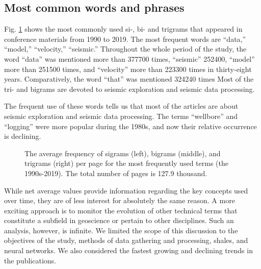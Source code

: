 \documentclass[geosciences,article,submit,moreauthors,pdftex]{Definitions/mdpi}
\begin{document}
\subsection{Most common words and phrases}

Fig. \ref{grams} shows the most commonly used si-, bi- and trigrams that appeared in conference materials from 1990 to 2019. The most frequent words are ``data,'' ``model,'' ``velocity,'' ``seismic.'' Throughout the whole period of the study, the word ``data'' was mentioned more than 377700 times, ``seismic'' 252400, ``model'' more than 251500 times, and ``velocity'' more than 223300 times in thirty-eight years. Comparatively, the word ``that'' was mentioned 324240 times Most of the tri- and bigrams are devoted to seismic exploration and seismic data processing. 

The frequent use of these words tells us that most of the articles are about seismic exploration and seismic data processing. The terms ``wellbore'' and ``logging'' were more popular during the 1980s, and now their relative occurrence is declining. 

\begin{figure}[ht!]
\caption{The average frequency of sigrams (left), bigrams (middle), and trigrams (right) per page for the most frequently used terms (the 1990s-2019). The total number of pages is 127.9 thousand.}
\label{grams}
\end{figure}

While net average values provide information regarding the key concepts used over time, they are of less interest for absolutely the same reason. A more exciting approach is to monitor the evolution of other technical terms that constitute a subfield in geoscience or pertain to other disciplines. Such an analysis, however, is infinite. We limited the scope of this discussion to the objectives of the study, methods of data gathering and processing, shales, and neural networks. We also considered the fastest growing and declining trends in the publications.
\end{document}
